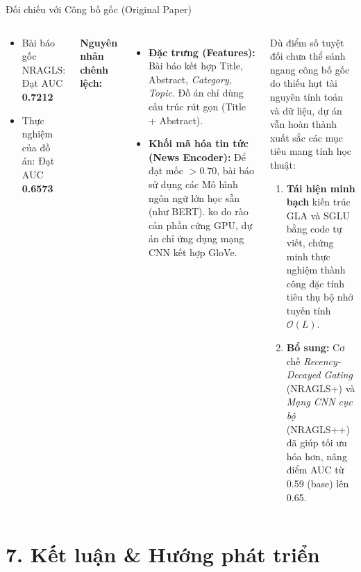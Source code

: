 \documentclass[aspectratio=169,11pt]{beamer}
\newcommand{\hl}[1]{\textcolor{accentorange}{\textbf{#1}}}
\newcommand{\faCheckCircle}{$\checkmark$}
\begin{document}
\begin{frame}{Đối chiếu với Công bố gốc (Original Paper)}
\scriptsize
  \begin{columns}[T]
      \begin{warnbox}[title={Khoảng cách hiệu năng}]
        \begin{itemize}
          \item Bài báo gốc NRAGLS: Đạt AUC \textbf{0.7212}
          \item Thực nghiệm của đồ án: Đạt AUC \hl{0.6573}
        \end{itemize}
      \end{warnbox}
      \vspace{0.4em}
      \textbf{Nguyên nhân chênh lệch:}
      \begin{itemize}
        \item \textbf{Đặc trưng (Features):} Bài báo kết hợp Title, Abstract, \textit{Category, Topic}. Đồ án chỉ dùng cấu trúc rút gọn (Title + Abstract).
        \item \textbf{Khối mã hóa tin tức (News Encoder):} Để đạt mốc $>0.70$, bài báo sử dụng các Mô hình ngôn ngữ lớn học sẵn (như BERT). ko do rào cản phần cứng GPU, dự án chỉ ứng dụng mạng CNN kết hợp GloVe.
      \end{itemize}

      \begin{goodbox}[title={\faCheckCircle\ Thành công cốt lõi của đồ án}]
        Dù điểm số tuyệt đối chưa thể sánh ngang công bố gốc do thiếu hụt tài nguyên tính toán và dữ liệu, dự án vẫn hoàn thành xuất sắc các mục tiêu mang tính học thuật:
        \begin{enumerate}
          \item \textbf{Tái hiện minh bạch} kiến trúc GLA và SGLU bằng code tự viết, chứng minh thực nghiệm thành công đặc tính tiêu thụ bộ nhớ tuyến tính $\mathcal{O}(L)$.
          \item \textbf{Bổ sung:} Cơ chế \textit{Recency-Decayed Gating} (NRAGLS+) và \textit{Mạng CNN cục bộ} (NRAGLS++) đã giúp tối ưu hóa hơn, nâng điểm AUC từ 0.59 (base) lên 0.65.
        \end{enumerate}
      \end{goodbox}
  \end{columns}
\end{frame}
\section{7. Kết luận \& Hướng phát triển}
\end{document}
